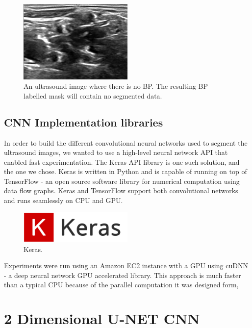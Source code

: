 \documentclass[letterpaper]{article}
\begin{document}
 \begin{figure}[H]
  \centerline{\includegraphics[width=0.5\textwidth]{Images/1_5NoNerve.png}}
  \caption{An ultrasound image where there is no BP. The resulting BP labelled mask will contain no segmented data.}
  \label{fig:BPMask}
\end{figure}

\subsection{CNN Implementation libraries}
In order to build the different convolutional neural networks used to segment the ultrasound images, we wanted to use a high-level neural network API that enabled fast experimentation. The Keras API library is one such solution, and the one we chose. Keras is written in Python and is capable of running on top of TensorFlow - an open source software library for numerical computation using data flow graphs. Keras and TensorFlow support both convolutional networks and runs seamlessly on CPU and GPU. 

 \begin{figure}[H]
  \centerline{\includegraphics[width=0.5\textwidth]{Images/Keras.png}}
  \caption{Keras.}
  \label{fig:keras}
\end{figure}

Experiments were run using an Amazon EC2 instance with a GPU using cuDNN - a deep neural network GPU accelerated library. This approach is much faster than a typical CPU because of the parallel computation it was designed form,

\section{2 Dimensional U-NET CNN}
\end{document}
